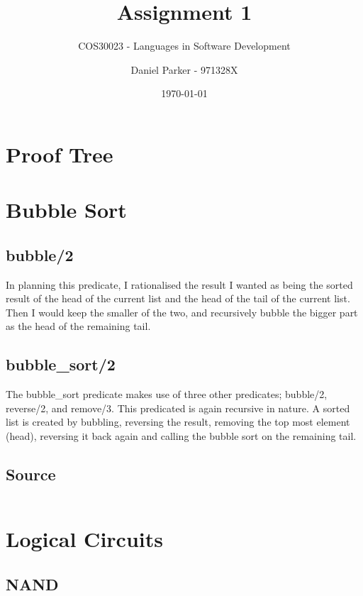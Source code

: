 \documentclass[11pt, english, numbers=endperiod]{scrartcl}
\title{Assignment 1}
\subtitle{COS30023 - Languages in Software Development}
\author{Daniel Parker - 971328X}
\date{\today}
\begin{document}
\maketitle

\section{Proof Tree}
\begin{prooftree}
\end{prooftree}

\section{Bubble Sort}
\subsection{bubble/2}
In planning this predicate, I rationalised the result I wanted as being the sorted result of the head of the current list and the head of the tail of the current list. Then I would keep the smaller of the two, and recursively bubble the bigger part as the head of the remaining tail.

\subsection{bubble\_sort/2}
The bubble\_sort predicate makes use of three other predicates; bubble/2, reverse/2, and remove/3. This predicated is again recursive in nature. A sorted list is created by bubbling, reversing the result, removing the top most element (head), reversing it back again and calling the bubble sort on the remaining tail.

\subsection{Source}
\inputminted[tabsize=4]{prolog}{bubblesort.pl}

\section{Logical Circuits}
\subsection{NAND}
\inputminted[firstline=3, lastline=7 ,tabsize=4]{prolog}{gates.pl}
\end{document}
